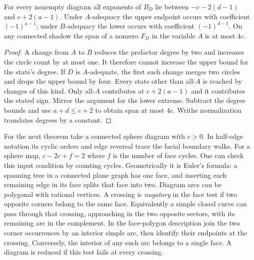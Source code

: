 \begin{theorem}
For every nonempty diagram all exponents of $B_D$ lie between
$-c-2(d-1)$ and $c+2(a-1)$. Under $A$-adequacy the upper endpoint occurs
with coefficient $(-1)^{a-1}$; under $B$-adequacy the lower occurs with
coefficient $(-1)^{d-1}$. On any connected shadow the span of a nonzero
$F_D$ in the variable $A$ is at most $4c$.
\end{theorem}
\begin{proof}
A change from $A$ to $B$ reduces the prefactor degree by two and
increases the circle count by at most one. It therefore cannot increase
the upper bound for the state's degree. If $D$ is $A$-adequate, the
first such change merges two circles and drops the upper bound by four.
Every state other than all-$A$ is reached by changes of this kind. Only
all-$A$ contributes at $c+2(a-1)$ and it contributes the stated sign.
Mirror the argument for the lower extreme. Subtract the degree bounds
and use $a+d\le c+2$ to obtain span at most $4c$. Writhe normalization
translates degrees by a constant.
\end{proof}

For the next theorem take a connected sphere diagram with $c>0$.
In half-edge notation its cyclic orders and edge reversal trace the
facial boundary walks. For a sphere map, $c-2c+f=2$ where $f$ is the
number of face cycles. One can check this input condition by counting
cycles. Geometrically it is Euler's formula: a spanning tree in a
connected plane graph has one face, and inserting each remaining edge in
its face splits that face into two. Diagram arcs can be polygonal with
rational vertices. A crossing is \emph{nugatory} in the face test if two
opposite corners belong to the same face. Equivalently a simple closed
curve can pass through that crossing, approaching in the two opposite
sectors, with its remaining arc in the complement. In the face-polygon
description join the two corner occurrences by an interior simple arc,
then identify their endpoints at the crossing. Conversely, the interior
of any such arc belongs to a single face. A diagram is reduced if this
test fails at every crossing.

